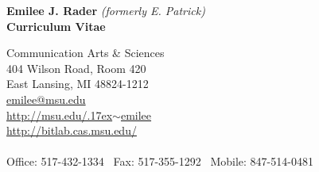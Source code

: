 \documentclass[9pt]{extarticle}
\newcommand{\mytilde}{\raise.17ex\hbox{$\scriptstyle\mathtt{\sim}$}}
\begin{document}
{\LARGE{\textbf{Emilee J. Rader}}} \emph{(formerly E. Patrick)} \\ \vspace{3pt}
\textbf{Curriculum Vitae}


\begin{tabbing}
Communication Arts \& Sciences \hspace{1.5in}\=  \\
404 Wilson Road, Room 420 \\
East Lansing, MI 48824-1212 \\
\href{mailto:emilee@msu.edu}{emilee@msu.edu} \\
\href{http://msu.edu/~emilee}{http://msu.edu/\mytilde emilee}  \\
\href{http://bitlab.cas.msu.edu/}{http://bitlab.cas.msu.edu/}  \\\\
Office: 517-432-1334  \textpipe  ~Fax: 517-355-1292  \textpipe  ~Mobile: 847-514-0481 \\\\\\
\end{tabbing}



\end{document}
